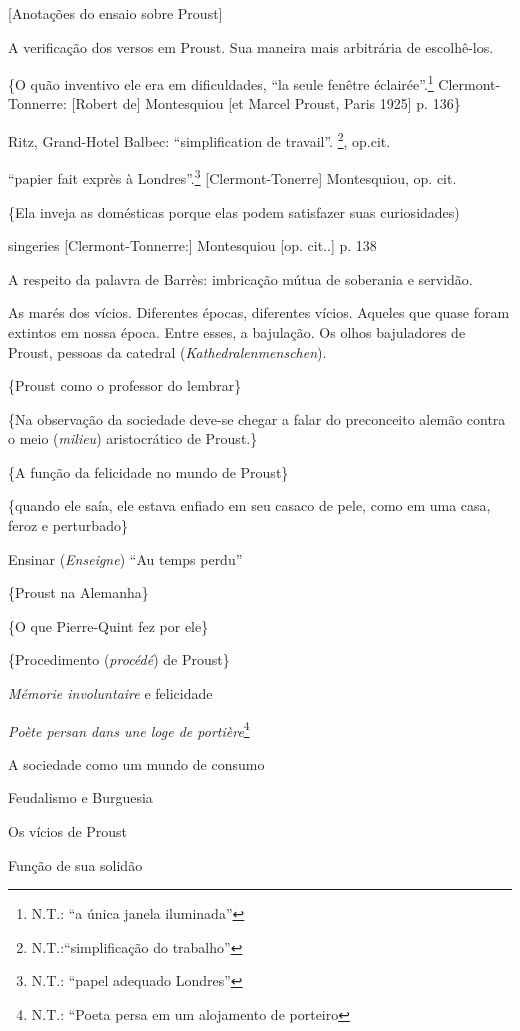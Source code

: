 {[}Anotações do ensaio sobre Proust{]}

A verificação dos versos em Proust. Sua maneira mais arbitrária de
escolhê-los.

\{O quão inventivo ele era em dificuldades, ``la seule fenêtre
éclairée''.\footnote{N.T.: ``a única janela iluminada''}
Clermont-Tonnerre: {[}Robert de{]} Montesquiou {[}et Marcel Proust,
Paris 1925{]} p. 136\}

Ritz, Grand-Hotel Balbec: ``simplification de travail''. \footnote{N.T.:``simplificação
  do trabalho''}, op.cit.

``papier fait exprès à Londres''.\footnote{N.T.: ``papel adequado
  Londres''} {[}Clermont-Tonerre{]} Montesquiou, op. cit.

\{Ela inveja as domésticas porque elas podem satisfazer suas
curiosidades)

singeries {[}Clermont-Tonnerre:{]} Montesquiou {[}op. cit..{]} p. 138

A respeito da palavra de Barrès: imbricação mútua de soberania e
servidão.

As marés dos vícios. Diferentes épocas, diferentes vícios. Aqueles que
quase foram extintos em nossa época. Entre esses, a bajulação. Os olhos
bajuladores de Proust, pessoas da catedral (\emph{Kathedralenmenschen}).

\{Proust como o professor do lembrar\}

\{Na observação da sociedade deve-se chegar a falar do preconceito
alemão contra o meio (\emph{milieu}) aristocrático de Proust.\}

\{A função da felicidade no mundo de Proust\}

\{quando ele saía, ele estava enfiado em seu casaco de pele, como em uma
casa, feroz e perturbado\}

Ensinar (\emph{Enseigne}) ``Au temps perdu''

\{Proust na Alemanha\}

\{O que Pierre-Quint fez por ele\}

\{Procedimento (\emph{procédé}) de Proust\}

\emph{Mémorie involuntaire} e felicidade

\emph{Poète persan dans une loge de portière}\footnote{N.T.: ``Poeta
  persa em um alojamento de porteiro}

A sociedade como um mundo de consumo

Feudalismo e Burguesia

Os vícios de Proust

Função de sua solidão


